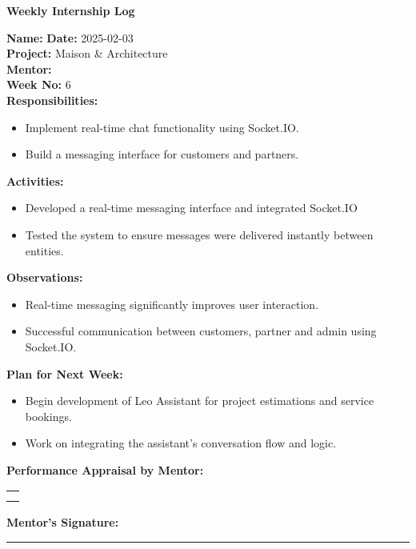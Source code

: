 \begin{center}
    \bfseries Weekly Internship Log
\end{center}

\noindent
\textbf{Name:}  \hfill \textbf{Date:} 2025-02-03 \\
\textbf{Project:} Maison \& Architecture \hfill \\
\textbf{Mentor:}  \\
\textbf{Week No:} 6 \\

\noindent
\textbf{Responsibilities:}
\begin{itemize}
    \item Implement real-time chat functionality using Socket.IO.
    \item Build a messaging interface for customers and partners.
\end{itemize}

\noindent
\textbf{Activities:}
\begin{itemize}
    \item Developed a real-time messaging interface and integrated Socket.IO
    \item Tested the system to ensure messages were delivered instantly between entities.
\end{itemize}

\noindent
\textbf{Observations:}
\begin{itemize}
    \item Real-time messaging significantly improves user interaction.
    \item Successful communication between customers, partner and admin using Socket.IO.
\end{itemize}

\noindent
\textbf{Plan for Next Week:}
\begin{itemize}
    \item Begin development of Leo Assistant for project estimations and service bookings.
    \item Work on integrating the assistant’s conversation flow and logic.
\end{itemize}

\noindent
\textbf{Performance Appraisal by Mentor:} \\
\begin{table}[h]
    \centering
    \noindent
    \begin{tabularx}{\textwidth} { 
        | >{\centering\arraybackslash}X| }

        \hline
        \\ \\
        \hline
    \end{tabularx}
\end{table}

\vspace{2em}
\noindent
\textbf{Mentor’s Signature:} \\
\rule{0.4\textwidth}{0.5pt}